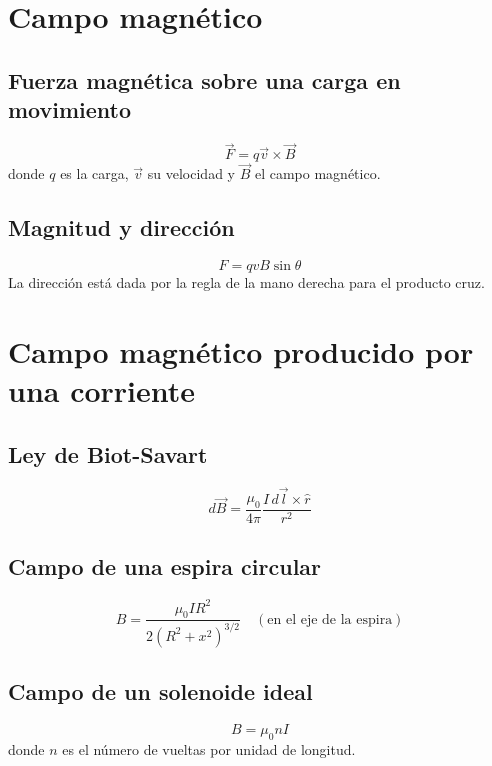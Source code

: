 \section{Campo magnético}

\subsection{Fuerza magnética sobre una carga en movimiento}
\begin{equation}
    \vec{F} = q \vec{v} \times \vec{B}
\end{equation}
donde \(q\) es la carga, \(\vec{v}\) su velocidad y \(\vec{B}\) el campo magnético.

\subsection{Magnitud y dirección}
\begin{equation}
    F = q v B \sin \theta
\end{equation}
La dirección está dada por la regla de la mano derecha para el producto cruz.

\section{Campo magnético producido por una corriente}

\subsection{Ley de Biot-Savart}
\begin{equation}
    d\vec{B} = \frac{\mu_0}{4\pi} \frac{I \, d\vec{l} \times \hat{r}}{r^2}
\end{equation}

\subsection{Campo de una espira circular}
\begin{equation}
    B = \frac{\mu_0 I R^2}{2 (R^2 + x^2)^{3/2}} \quad (\text{en el eje de la espira})
\end{equation}

\subsection{Campo de un solenoide ideal}
\begin{equation}
    B = \mu_0 n I
\end{equation}
donde \(n\) es el número de vueltas por unidad de longitud.

